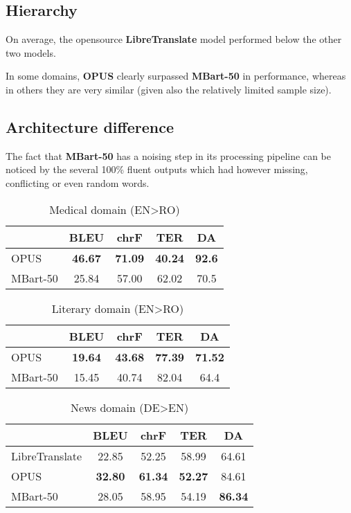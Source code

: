 \documentclass[11pt]{article}
\begin{document}
\subsection{Hierarchy}

On average, the opensource \textbf{LibreTranslate} model
performed below the other two models.

In some domains, \textbf{OPUS} clearly surpassed \textbf{MBart-50} in performance,
whereas in others they are very similar (given also the relatively limited sample size).

\subsection{Architecture difference}

The fact that \textbf{MBart-50} has a noising step in its processing pipeline can be noticed
by the several 100\% fluent outputs which had however missing, conflicting or even random words.

\begin{table}
    \centering
    \begin{tabular}{lcccc}
    \hline
        & BLEU & chrF & TER & DA \\
    \hline
        OPUS & \textbf{46.67} & \textbf{71.09} & \textbf{40.24} & \textbf{92.6}\\
        MBart-50 & 25.84 & 57.00 & 62.02 & 70.5
    \end{tabular}
    \caption{Medical domain (EN>RO)}
\end{table}

\begin{table}
    \centering
    \begin{tabular}{lcccc}
    \hline
        & BLEU & chrF & TER & DA\\
    \hline
        OPUS & \textbf{19.64} & \textbf{43.68} & \textbf{77.39} & \textbf{71.52}\\
        MBart-50 & 15.45 & 40.74 & 82.04 & 64.4
    \end{tabular}
    \caption{Literary domain (EN>RO)}
\end{table}

\begin{table}
    \centering
    \begin{tabular}{lcccc}
    \hline
        & BLEU & chrF & TER & DA\\
    \hline
        LibreTranslate & 22.85 & 52.25 & 58.99 & 64.61 \\
        OPUS & \textbf{32.80} & \textbf{61.34} & \textbf{52.27} & 84.61 \\
        MBart-50 & 28.05 & 58.95 & 54.19 & \textbf{86.34}
    \end{tabular}
    \caption{News domain (DE>EN)}
\end{table}
\end{document}

